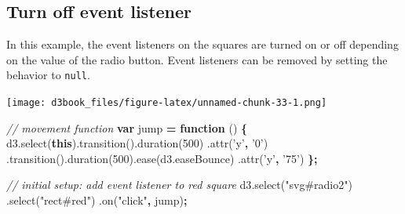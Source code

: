 \documentclass[openany]{book}
\newenvironment{Shaded}{\begin{snugshade}}{\end{snugshade}}
\newcommand{\AttributeTok}[1]{\textcolor[rgb]{0.77,0.63,0.00}{#1}}
\newcommand{\CommentTok}[1]{\textcolor[rgb]{0.56,0.35,0.01}{\textit{#1}}}
\newcommand{\DecValTok}[1]{\textcolor[rgb]{0.00,0.00,0.81}{#1}}
\newcommand{\KeywordTok}[1]{\textcolor[rgb]{0.13,0.29,0.53}{\textbf{#1}}}
\newcommand{\NormalTok}[1]{#1}
\newcommand{\OperatorTok}[1]{\textcolor[rgb]{0.81,0.36,0.00}{\textbf{#1}}}
\newcommand{\StringTok}[1]{\textcolor[rgb]{0.31,0.60,0.02}{#1}}
\newcommand{\VariableTok}[1]{\textcolor[rgb]{0.00,0.00,0.00}{#1}}
\begin{document}
\hypertarget{turn-off-event-listener}{%
\subsection{Turn off event listener}\label{turn-off-event-listener}}

In this example, the event listeners on the squares are turned on or off depending on the value of the radio button. Event listeners can be removed by setting the behavior to \texttt{null}.

\texttt{[image: d3book\_files/figure-latex/unnamed-chunk-33-1.png]}

\begin{Shaded}
\begin{Highlighting}[]
\CommentTok{// movement function}
\KeywordTok{var}\NormalTok{ jump }\OperatorTok{=} \KeywordTok{function}\NormalTok{ () }\OperatorTok{\{}
      \VariableTok{d3}\NormalTok{.}\AttributeTok{select}\NormalTok{(}\KeywordTok{this}\NormalTok{).}\AttributeTok{transition}\NormalTok{().}\AttributeTok{duration}\NormalTok{(}\DecValTok{500}\NormalTok{)}
\NormalTok{      .}\AttributeTok{attr}\NormalTok{(}\StringTok{'y'}\OperatorTok{,} \StringTok{'0'}\NormalTok{)}
\NormalTok{      .}\AttributeTok{transition}\NormalTok{().}\AttributeTok{duration}\NormalTok{(}\DecValTok{500}\NormalTok{).}\AttributeTok{ease}\NormalTok{(}\VariableTok{d3}\NormalTok{.}\AttributeTok{easeBounce}\NormalTok{)}
\NormalTok{      .}\AttributeTok{attr}\NormalTok{(}\StringTok{'y'}\OperatorTok{,} \StringTok{'75'}\NormalTok{)}
\OperatorTok{\};}

\CommentTok{// initial setup: add event listener to red square}
\VariableTok{d3}\NormalTok{.}\AttributeTok{select}\NormalTok{(}\StringTok{"svg#radio2"}\NormalTok{)}
\NormalTok{  .}\AttributeTok{select}\NormalTok{(}\StringTok{"rect#red"}\NormalTok{)}
\NormalTok{  .}\AttributeTok{on}\NormalTok{(}\StringTok{"click"}\OperatorTok{,}\NormalTok{ jump)}\OperatorTok{;}
    

\end{Highlighting}
\end{Shaded}
\end{document}
